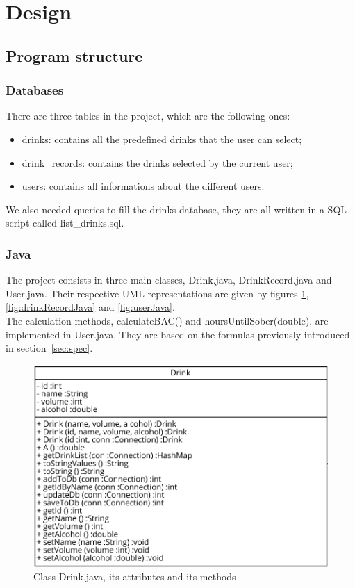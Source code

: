 \section{Design}
\label{sec:design}

\subsection{Program structure}
\label{ssec:struct}

\subsubsection{Databases}
\label{sssec:db}

There are three tables in the project, which are the following ones:

\begin{itemize}[noitemsep]
\item drinks: contains all the predefined drinks that the user can select;
\item drink\_records: contains the drinks selected by the current user;
\item users: contains all informations about the different users.
\end{itemize}

We also needed queries to fill the \guillemotleft{} drinks \guillemotright{} database, they are all written in a SQL script called list\_drinks.sql.

\subsubsection{Java}
\label{sssec:java}

The project consists in three main classes, Drink.java, DrinkRecord.java and User.java. Their respective UML representations are given by {\sc figures} \ref{fig:drinkJava}, \ref{fig:drinkRecordJava} and \ref{fig:userJava}.\\

The calculation methods, calculateBAC() and hoursUntilSober(double), are implemented in User.java. They are based on the formulas previously introduced in {\sc section}~\ref{sec:spec}. 

\begin{figure}[H]
\centering
   \includegraphics{./figures/drink.png}
   \caption{Class Drink.java, its attributes and its methods}
   \label{fig:drinkJava}
\end{figure}

